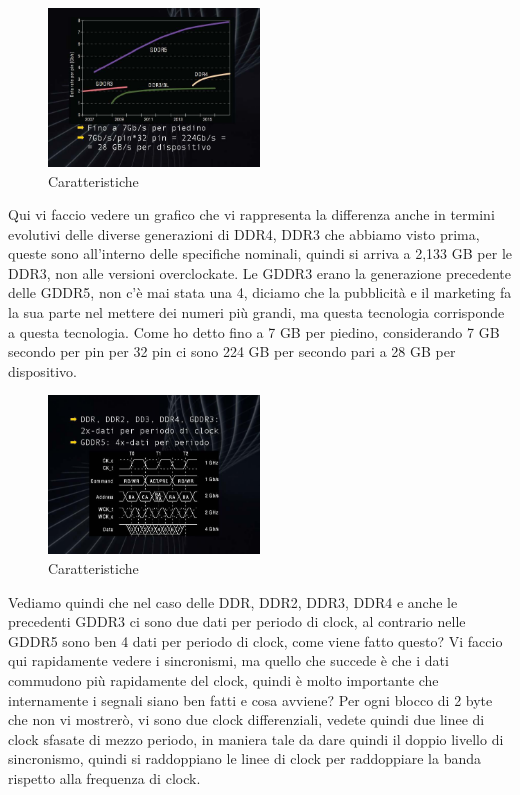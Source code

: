 \FloatBarrier
\begin{figure}[H]
  \centering
  \includegraphics[width=0.50\textwidth,
                    trim=40 40 40 10, %
                    clip]
                    {images/Lez05_p03_fig_03.png}
  \caption{Caratteristiche}
  \label{fig:Lez05_p03_fig_03}
\end{figure}
\FloatBarrier
\noindent

Qui vi faccio vedere un grafico che vi rappresenta la differenza anche in termini evolutivi delle diverse generazioni di DDR4, DDR3 che abbiamo visto prima, queste sono all'interno delle specifiche nominali, quindi si arriva a 2,133 GB per le DDR3, non alle versioni overclockate.
Le GDDR3 erano la generazione precedente delle GDDR5, non c'è mai stata una 4, diciamo che la pubblicità e il marketing fa la sua parte nel mettere dei numeri più grandi, ma questa tecnologia corrisponde a questa tecnologia.
Come ho detto fino a 7 GB per piedino, considerando 7 GB secondo per pin per 32 pin ci sono 224 GB per secondo pari a 28 GB per dispositivo.

\FloatBarrier
\begin{figure}[H]
  \centering
  \includegraphics[width=0.50\textwidth,
                    trim=40 40 40 10, %
                    clip]
                    {images/Lez05_p03_fig_05.png}
  \caption{Caratteristiche}
  \label{fig:Lez05_p03_fig_05}
\end{figure}
\FloatBarrier
\noindent

Vediamo quindi che nel caso delle DDR, DDR2, DDR3, DDR4 e anche le precedenti GDDR3 ci sono due dati per periodo di clock, al contrario nelle GDDR5 sono ben 4 dati per periodo di clock, come viene fatto questo?
Vi faccio qui rapidamente vedere i sincronismi, ma quello che succede è che i dati commudono più rapidamente del clock, quindi è molto importante che internamente i segnali siano ben fatti e cosa avviene?
Per ogni blocco di 2 byte che non vi mostrerò, vi sono due clock differenziali, vedete quindi due linee di clock sfasate di mezzo periodo, in maniera tale da dare quindi il doppio livello di sincronismo, quindi si raddoppiano le linee di clock per raddoppiare la banda rispetto alla frequenza di clock.

